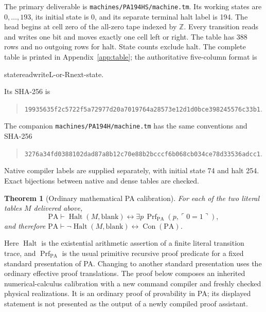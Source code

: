 \documentclass[11pt,letterpaper]{article}
\newcommand{\PA}{\mathrm{PA}}
\newcommand{\Con}{\operatorname{Con}}
\newcommand{\Halt}{\operatorname{Halt}}
\newcommand{\file}[1]{\texttt{\nolinkurl{#1}}}
\newtheorem{theorem}{Theorem}[section]
\begin{document}
The primary deliverable is \file{machines/PA194HS/machine.tm}. Its working
states are $0,\ldots,193$, its initial state is 0, and its separate terminal
halt label is 194. The head begins at cell zero of the all-zero tape indexed
by $\mathbb Z$. Every transition reads and writes one bit and moves exactly
one cell left or right. The table has 388 rows and no outgoing rows for halt.
State counts exclude halt. The complete table is printed in
Appendix~\ref{app:table}; the authoritative five-column format is
\begin{center}\ttfamily state\quad read\quad write\quad L-or-R\quad next-state.\end{center}
Its SHA-256 is
\begin{quote}\small\nolinkurl{19935635f2c5722f5a72977d20a7019764a28573e12d1d0bce398245576c33b1}.\end{quote}
The companion \file{machines/PA194H/machine.tm} has the same conventions and
SHA-256
\begin{quote}\small\nolinkurl{3276a34fd0388102dad87a8b12c70e88b2bcccf6b068cb034ce78d33536adcc1}.\end{quote}
Native compiler labels are supplied separately, with initial state 74 and
halt 254. Exact bijections between native and dense tables are checked.

\begin{theorem}[Ordinary mathematical PA calibration]
For each of the two literal tables $M$ delivered above,
\[
 \PA\vdash \Halt(M,\mathrm{blank})
       \leftrightarrow
       \exists p\,\operatorname{Prf}_{\PA}(p,\ulcorner0=1\urcorner),
\]
and therefore $\PA\vdash\neg\Halt(M,\mathrm{blank})\leftrightarrow\Con(\PA)$.
\end{theorem}
Here $\Halt$ is the existential arithmetic assertion of a finite literal
transition trace, and $\operatorname{Prf}_{\PA}$ is the usual primitive
recursive proof predicate for a fixed standard presentation of PA.
Changing to another standard presentation uses the ordinary effective
proof translations. The proof below composes an inherited numerical-calculus
calibration with a new command compiler and freshly checked physical
realizations. It is an ordinary proof of provability in PA; its displayed
statement is not presented as the output of a newly compiled proof assistant.
\end{document}
